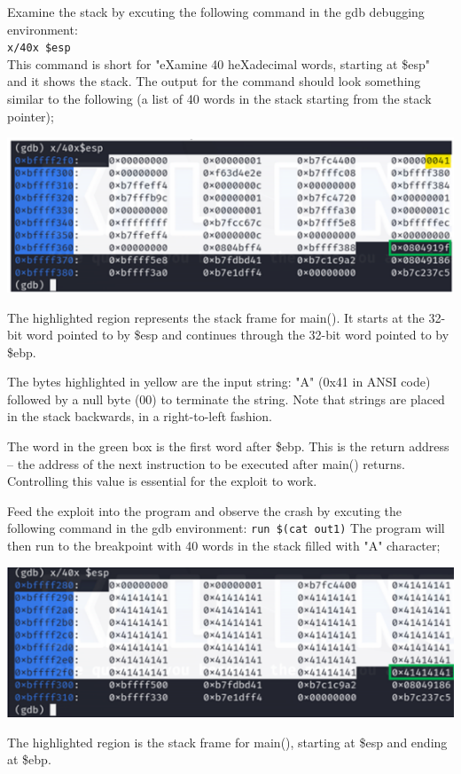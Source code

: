 \documentclass[]{project_plan}
\begin{document}
Examine the stack by excuting the following command in the gdb debugging environment:\\
\lstinline|x/40x $esp|\\
This command is short for "eXamine 40 heXadecimal words, starting at
\$esp" and it shows the stack. The output for the command should look
something similar to the following (a list of 40 words in the stack starting
from the stack pointer);

\includegraphics[width=.8\linewidth]{lab4 examined words.png}

The highlighted region represents the stack frame for main(). It
starts at the 32-bit word pointed to by \$esp and continues through
the 32-bit word pointed to by \$ebp.

The bytes highlighted in yellow are the input string: "A" (0x41 in
ANSI code) followed by a null byte (00) to terminate the string.
Note that strings are placed in the stack backwards, in a right-to-left
fashion.

The word in the green box is the first word after \$ebp. This is the
return address – the address of the next instruction to be executed
after main() returns. Controlling this value is essential for the exploit
to work.

Feed the exploit into the program and observe the crash by excuting the
following command in the gdb environment: \lstinline|run $(cat out1)|
The program will then run to the breakpoint with 40 words in the stack filled
with "A" character;

\includegraphics[width=.8\linewidth]{lab4 A examined words.png}

The highlighted region is the stack frame for main(), starting at \$esp and
ending at \$ebp.
\end{document}
